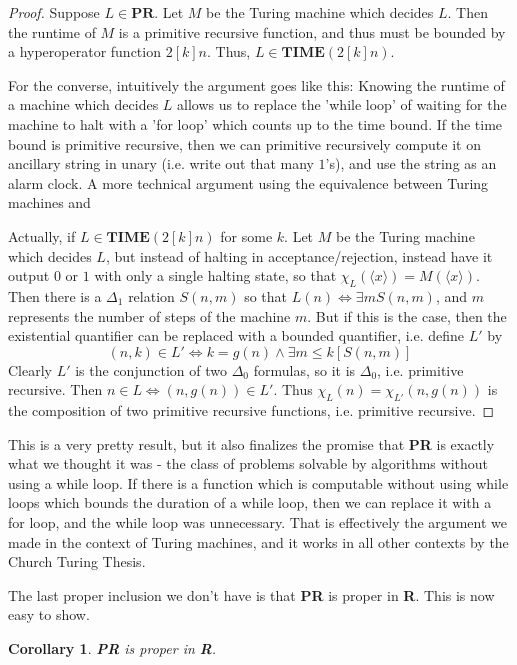 \documentclass{article}
\theoremstyle{definition}
\theoremstyle{plain}
\theoremstyle{theorem}
\newtheorem{corollary}{Corollary}[section]
\begin{document}
\begin{proof}
	Suppose $L \in \textbf{PR}$. Let $M$ be the Turing machine which decides $L$. Then the runtime of $M$ is a primitive recursive function, and thus must be bounded by a hyperoperator function $2[k]n$. Thus, $L \in \textbf{TIME}(2[k]n)$. 
	\par For the converse, intuitively the argument goes like this: Knowing the runtime of a machine which decides $L$ allows us to replace the 'while loop' of waiting for the machine to halt with a 'for loop' which counts up to the time bound. If the time bound is primitive recursive, then we can primitive recursively compute it on ancillary string in unary (i.e. write out that many $1$'s), and use the string as an alarm clock. A more technical argument using the equivalence between Turing machines and
	\par Actually, if $L \in \textbf{TIME}(2[k]n)$ for some $k$. Let $M$ be the Turing machine which decides $L$, but instead of halting in acceptance/rejection, instead have it output $0$ or $1$ with only a single halting state, so that $\chi_L(\langle x \rangle) = M(\langle x \rangle)$. Then there is a $\Delta_1$ relation $S(n,m)$ so that $L(n) \iff \exists m S(n,m)$, and $m$ represents the number of steps of the machine $m$. But if this is the case, then the existential quantifier can be replaced with a bounded quantifier, i.e. define $L'$ by
	 \[ (n,k) \in L' \iff k = g(n) \wedge \exists m \leq k [S(n,m)] \]
Clearly $L'$ is the conjunction of two $\Delta_0$ formulas, so it is $\Delta_0$, i.e. primitive recursive. Then $n \in L \iff (n,g(n)) \in L'$. Thus $ \chi_L(n) = \chi_{L'}(n,g(n))$ is the composition of two primitive recursive functions, i.e. primitive recursive. 
\end{proof}
This is a very pretty result, but it also finalizes the promise that \textbf{PR} is exactly what we thought it was - the class of problems solvable by algorithms without using a while loop. If there is a function which is computable without using while loops which bounds the duration of a while loop, then we can replace it with a for loop, and the while loop was unnecessary. That is effectively the argument we made in the context of Turing machines, and it works in all other contexts by the Church Turing Thesis.
\par The last proper inclusion we don't have is that \textbf{PR} is proper in \textbf{R}. This is now easy to show.
\begin{corollary}
	\textbf{PR} is proper in \textbf{R}.
\end{corollary}
\end{document}
